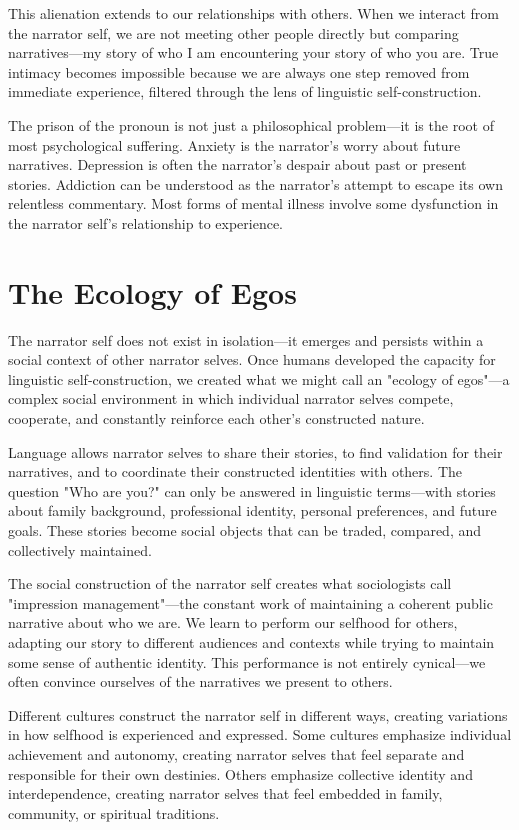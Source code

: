 This alienation extends to our relationships with others. When we interact from the narrator self, we are not meeting other people directly but comparing narratives—my story of who I am encountering your story of who you are. True intimacy becomes impossible because we are always one step removed from immediate experience, filtered through the lens of linguistic self-construction.

The prison of the pronoun is not just a philosophical problem—it is the root of most psychological suffering. Anxiety is the narrator's worry about future narratives. Depression is often the narrator's despair about past or present stories. Addiction can be understood as the narrator's attempt to escape its own relentless commentary. Most forms of mental illness involve some dysfunction in the narrator self's relationship to experience.

\section{The Ecology of Egos}

The narrator self does not exist in isolation—it emerges and persists within a social context of other narrator selves. Once humans developed the capacity for linguistic self-construction, we created what we might call an "ecology of egos"—a complex social environment in which individual narrator selves compete, cooperate, and constantly reinforce each other's constructed nature.

Language allows narrator selves to share their stories, to find validation for their narratives, and to coordinate their constructed identities with others. The question "Who are you?" can only be answered in linguistic terms—with stories about family background, professional identity, personal preferences, and future goals. These stories become social objects that can be traded, compared, and collectively maintained.

The social construction of the narrator self creates what sociologists call "impression management"—the constant work of maintaining a coherent public narrative about who we are. We learn to perform our selfhood for others, adapting our story to different audiences and contexts while trying to maintain some sense of authentic identity. This performance is not entirely cynical—we often convince ourselves of the narratives we present to others.

Different cultures construct the narrator self in different ways, creating variations in how selfhood is experienced and expressed. Some cultures emphasize individual achievement and autonomy, creating narrator selves that feel separate and responsible for their own destinies. Others emphasize collective identity and interdependence, creating narrator selves that feel embedded in family, community, or spiritual traditions.

